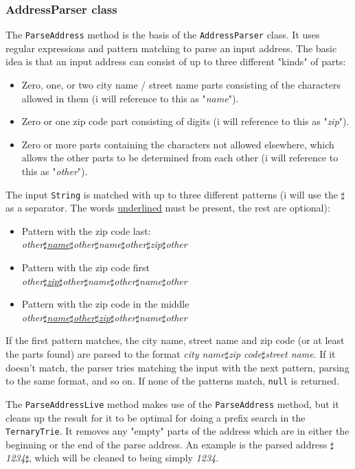 \subsubsection{AddressParser class}
The \texttt{ParseAddress} method is the basis of the \texttt{AddressParser} class. It uses regular expressions and pattern matching to parse an input address. The basic idea is that an input address can consist of up to three different "kinds" of parts:
\begin{itemize}
	\item Zero, one, or two city name / street name parts consisting of the characters allowed in them (i will reference to this as "\textit{name}").
	\item Zero or one zip code part consisting of digits (i will reference to this as "\textit{zip}").
	\item Zero or more parts containing the characters not allowed elsewhere, which allows the other parts to be determined from each other (i will reference to this as "\textit{other}").
\end{itemize}
The input \texttt{String} is matched with up to three different patterns (i will use the $\sharp$ as a separator. The words \underline{underlined} must be present, the rest are optional):
\begin{itemize}
	\item Pattern with the zip code last: \\
		\textit{other$\sharp$\underline{name}$\sharp$other$\sharp$name$\sharp$other$\sharp$zip$\sharp$other}
	\item Pattern with the zip code first \\
	\textit{other$\sharp$\underline{zip}$\sharp$other$\sharp$name$\sharp$other$\sharp$name$\sharp$other}
	\item Pattern with the zip code in the middle \\
	\textit{other$\sharp$\underline{name$\sharp$other$\sharp$zip}$\sharp$other$\sharp$name$\sharp$other}
\end{itemize}
If the first pattern matches, the city name, street name and zip code (or at least the parts found) are parsed to the format \textit{city name$\sharp$zip code$\sharp$street name}. If it doesn't match, the parser tries matching the input with the next pattern, parsing to the same format, and so on. If none of the patterns match, \texttt{null} is returned.

The \texttt{ParseAddressLive} method makes use of the \texttt{ParseAddress} method, but it cleans up the result for it to be optimal for doing a prefix search in the \texttt{TernaryTrie}. It removes any "empty" parts of the address which are in either the beginning or the end of the parse address. An example is the parsed address \textit{$\sharp$1234$\sharp$}, which will be cleaned to being simply \textit{1234}.

